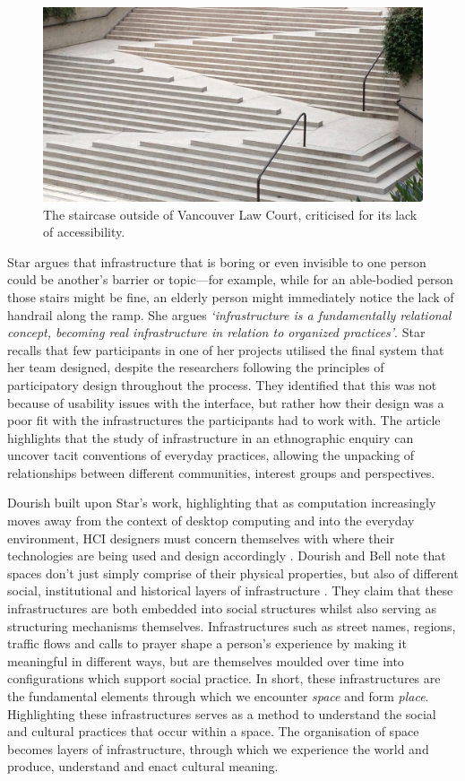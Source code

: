 \begin{figure}
  \centering
  \includegraphics[width=0.8\columnwidth]{images/chapter02/stairs.jpg}
  \caption{The staircase outside of Vancouver Law Court, criticised for its lack of accessibility.}
  \label{fig:stairs}
\end{figure}

Star argues that infrastructure that is boring or even invisible to one person could be another's barrier or topic---for example, while for an able-bodied person those stairs might be fine, an elderly person might immediately notice the lack of handrail along the ramp. She argues \textit{`infrastructure is a fundamentally relational concept, becoming real infrastructure in relation to organized practices'}. Star recalls that few participants in one of her projects utilised the final system that her team designed, despite the researchers following the principles of participatory design throughout the process. They identified that this was not because of usability issues with the interface, but rather how their design was a poor fit with the infrastructures the participants had to work with. The article highlights that the study of infrastructure in an ethnographic enquiry can uncover tacit conventions of everyday practices, allowing the unpacking of relationships between different communities, interest groups and perspectives.

Dourish built upon Star's work, highlighting that as computation increasingly moves away from the context of desktop computing and into the everyday environment, HCI designers must concern themselves with where their technologies are being used and design accordingly \citep{Dourish2006}. Dourish and Bell note that spaces don't just simply comprise of their physical properties, but also of different social, institutional and historical layers of infrastructure \citep{Dourish2007}. They claim that these infrastructures are both embedded into social structures whilst also serving as structuring mechanisms themselves. Infrastructures such as street names, regions, traffic flows and calls to prayer shape a person's experience by making it meaningful in different ways, but are themselves moulded over time into configurations which support social practice. In short, these infrastructures are the fundamental elements through which we encounter \textit{space} and form \textit{place}. Highlighting these infrastructures serves as a method to understand the social and cultural practices that occur within a space. The organisation of space becomes layers of infrastructure, through which we experience the world and produce, understand and enact cultural meaning. 

